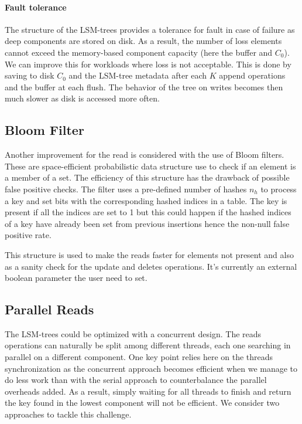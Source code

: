 \documentclass{sig-alternate-05-2015}
\begin{document}
\paragraph{Fault tolerance}

The structure of the LSM-trees provides a tolerance for fault in case of failure as deep components are stored on disk. As a result, the number of loss elements cannot exceed the memory-based component capacity (here the buffer and $C_0$). We can improve this for workloads where loss is not acceptable. This is done by saving to disk $C_0$ and the LSM-tree metadata after each $K$ append operations and the buffer at each flush. The behavior of the tree on writes becomes then much slower as disk is accessed more often.

\subsection{Bloom Filter}

Another improvement for the read is considered with the use of Bloom filters. These are space-efficient probabilistic data structure use to check if an element is a member of a set. The efficiency of this structure has the drawback of possible false positive checks. The filter uses a pre-defined number of hashes $n_h$ to process a key and set bits with the corresponding hashed indices in a table. The key is present if all the indices are set to 1 but this could happen if the hashed indices of a key have already been set from previous insertions hence the non-null false positive rate.

This structure is used to make the reads faster for elements not present and also as a sanity check for the update and deletes operations. It's currently an external boolean parameter the user need to set.

\subsection{Parallel Reads}

The LSM-trees could be optimized with a concurrent design. The reads operations can naturally be split among different threads, each one searching in parallel on a different component. One key point relies here on the threads synchronization as the concurrent approach becomes efficient when we manage to do less work than with the serial approach to counterbalance the parallel overheads added. As a result, simply waiting for all threads to finish and return the key found in the lowest component will not be efficient. We consider two approaches to tackle this challenge.
\end{document}
